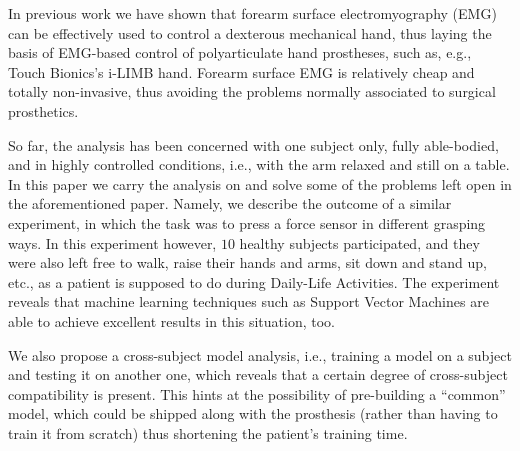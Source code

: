 In previous work \cite{2008.ICRA,2008.BioCyb} we have shown that
forearm surface electromyography (EMG) can be effectively used to
control a dexterous mechanical hand, thus laying the basis of
EMG-based control of polyarticulate hand prostheses, such as, e.g.,
Touch Bionics's i-LIMB hand. Forearm surface EMG is relatively cheap
and totally non-invasive, thus avoiding the problems normally
associated to surgical prosthetics.

So far, the analysis has been concerned with one subject only, fully
able-bodied, and in highly controlled conditions, i.e., with the arm
relaxed and still on a table. In this paper we carry the analysis on
and solve some of the problems left open in the aforementioned
paper. Namely, we describe the outcome of a similar experiment, in
which the task was to press a force sensor in different grasping
ways. In this experiment however, $10$ healthy subjects participated,
and they were also left free to walk, raise their hands and arms, sit
down and stand up, etc., as a patient is supposed to do during
Daily-Life Activities. The experiment reveals that machine learning
techniques such as Support Vector Machines are able to achieve
excellent results in this situation, too.

We also propose a cross-subject model analysis, i.e., training a model
on a subject and testing it on another one, which reveals that a
certain degree of cross-subject compatibility is present. This hints
at the possibility of pre-building a ``common'' model, which could be
shipped along with the prosthesis (rather than having to train it from
scratch) thus shortening the patient's training time.

